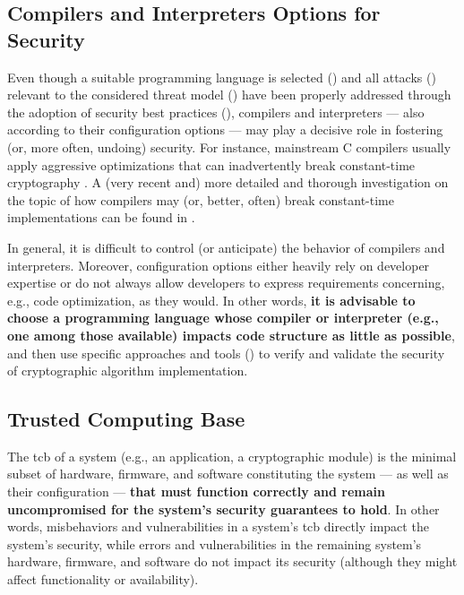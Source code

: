 \subsection{Compilers and Interpreters Options for Security}\label{sec:programming_languages_and_software:compilers}

Even though a suitable programming language is selected () and all attacks () relevant to the considered threat model () have been properly addressed through the adoption of security best practices (), compilers and interpreters --- also according to their configuration options --- may play a decisive role in fostering (or, more often, undoing) security. For instance, mainstream C compilers usually apply aggressive optimizations that can inadvertently break constant-time cryptography \cite{simon_what_2018}. A (very recent and) more detailed and thorough investigation on the topic of how compilers may (or, better, often) break constant-time implementations can be found in \cite{schneider_breaking_2024}. 

In general, it is difficult to control (or anticipate) the behavior of compilers and interpreters. Moreover, configuration options either heavily rely on developer expertise or do not always allow developers to express requirements concerning, e.g., code optimization, as they would. In other words, \textbf{it is advisable to choose a programming language whose compiler or interpreter (e.g., one among those available) impacts code structure as little as possible}, and then use specific approaches and tools () to verify and validate the security of cryptographic algorithm implementation.


\subsection{Trusted Computing Base}\label{sec:programming_languages_and_software:trusted_computing_base}

The \gls{tcb} of a system (e.g., an application, a cryptographic module) is the minimal subset of hardware, firmware, and software constituting the system --- as well as their configuration --- \textbf{that must function correctly and remain uncompromised for the system's security guarantees to hold}. In other words, misbehaviors and vulnerabilities in a system's \gls{tcb} directly impact the system's security, while errors and vulnerabilities in the remaining system's hardware, firmware, and software do not impact its security (although they might affect functionality or availability).

